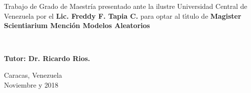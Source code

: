 \vspace{2cm}

\hspace{6cm}
\begin{minipage}[t]{9cm}
Trabajo de Grado de Maestr\'ia presentado ante la ilustre Universidad Central de Venezuela por el
\textbf{Lic. Freddy F. Tapia C.} para optar al t\'{\i}tulo de \textbf{Magister Scientiarium Menci\'on Modelos Aleatorios}

\

\textbf{Tutor: Dr. Ricardo Rios.}
\end{minipage}



\vspace{1.5cm}

\begin{center}
Caracas, Venezuela \\
Noviembre y 2018
\end{center}

\newpage
